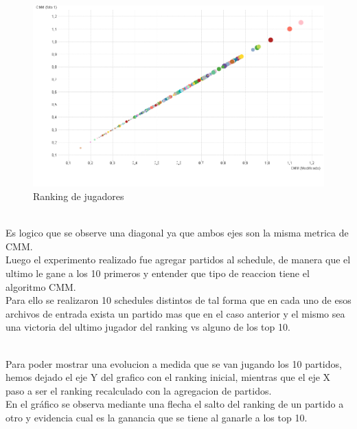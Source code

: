 \begin{figure}[H]
\centering
\includegraphics[width=1\textwidth]{IMG/comparativa cmm -cmm foto 0.png}
\caption{Ranking de jugadores}
\label{fig:Ranking de jugadores}
\end{figure}

\\
Es logico que se observe una diagonal ya que ambos ejes son la misma metrica de CMM.
\\
Luego el experimento realizado fue agregar partidos al schedule, de manera que el ultimo le gane a los 10 primeros y entender que tipo de reaccion tiene el algoritmo CMM.
\\
Para ello se realizaron 10 schedules distintos de tal forma que en cada uno de esos archivos de entrada exista un partido mas que en el caso anterior y
el mismo sea una victoria del ultimo jugador del ranking vs alguno de los top 10.

\\
Para poder mostrar una evolucion a medida que se van jugando los 10 partidos, hemos dejado el eje Y del grafico con el ranking inicial, mientras que el eje X paso a ser el ranking recalculado con la agregacion de partidos.\\
En el gráfico se observa mediante una flecha el salto del ranking de un partido a otro y evidencia cual es la ganancia que se tiene al ganarle a los top 10. 
\\

